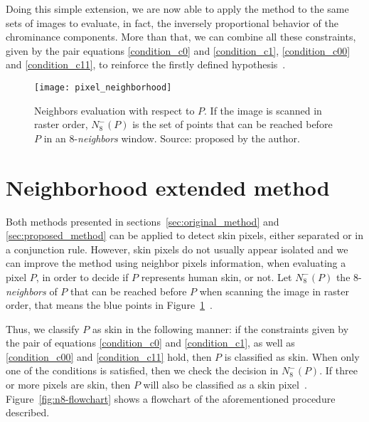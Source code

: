 Doing this simple extension, we are now able to apply the method to the same sets of images to evaluate, in fact, the inversely proportional behavior of the chrominance components. More than that, we can combine all these constraints, given by the pair equations \ref{condition_c0} and \ref{condition_c1}, \ref{condition_c00} and \ref{condition_c11}, to reinforce the firstly defined hypothesis~\citep{faria:18}.


\begin{figure}[!htp]
    \centering
    \texttt{[image: pixel\_neighborhood]}
    \caption[Neighbors evaluation with respect to a pixel $P$]{Neighbors evaluation with respect to $P$. If the image is scanned in raster order, $N_8^-(P)$ is the set of points that can be reached before $P$ in an 8-\textit{neighbors} window. Source: proposed by the author.}
    \label{fig:pixel_neighborhood}
\end{figure}


\section{Neighborhood extended method}
\label{sec:neighborhood_extended_method}
\noindent Both methods presented in sections~\ref{sec:original_method} and \ref{sec:proposed_method} can be applied to detect skin pixels, either separated or in a conjunction rule. However, skin pixels do not usually appear isolated and we can improve the method using neighbor pixels information, when evaluating a pixel $P$, in order to decide if $P$ represents human skin, or not. Let $N_8^-(P)$ the 8-\textit{neighbors} of $P$ that can be reached before $P$ when scanning the image in raster order, that means the blue points in Figure~\ref{fig:pixel_neighborhood}~\citep{faria:18}.

Thus, we classify $P$ as skin in the following manner: if the constraints given by the pair of equations \ref{condition_c0} and \ref{condition_c1}, as well as \ref{condition_c00} and \ref{condition_c11} hold, then $P$ is classified as skin. When only one of the conditions is satisfied, then we check the decision in $N_8^-(P)$. If three or more pixels are skin, then $P$ will also be classified as a skin pixel~\citep{faria:18}. Figure~\ref{fig:n8-flowchart} shows a flowchart of the aforementioned procedure described.

